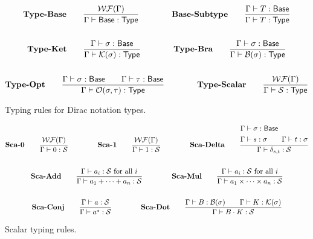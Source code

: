\documentclass{article}
\begin{document}
\begin{figure}[h]
    \begin{gather*}
        \textbf{Type-Base} \qquad
        \frac{\mathcal{WF}(\Gamma)}{\Gamma \vdash \mathsf{Base} : \mathsf{Type}} 
        \qquad \qquad
        \textbf{Base-Subtype} \qquad
        \frac{\Gamma \vdash T : \mathsf{Base}}{\Gamma \vdash T : \mathsf{Type}} \\
        \\
        \textbf{Type-Ket} \qquad
        \frac{\Gamma \vdash \sigma : \mathsf{Base}}{\Gamma \vdash \mathcal{K}(\sigma) : \mathsf{Type}}
        \qquad \qquad
        \textbf{Type-Bra} \qquad
        \frac{\Gamma \vdash \sigma : \mathsf{Base}}{\Gamma \vdash \mathcal{B}(\sigma) : \mathsf{Type}} \\
        \\
        \textbf{Type-Opt} \qquad
        \frac{\Gamma \vdash \sigma : \mathsf{Base} \qquad \Gamma \vdash \tau : \mathsf{Base}}{\Gamma \vdash \mathcal{O}(\sigma, \tau) : \mathsf{Type}}
        \qquad \qquad
        \textbf{Type-Scalar} \qquad
        \frac{\mathcal{WF}(\Gamma)}{\Gamma \vdash \mathcal{S} : \mathsf{Type}}
    \end{gather*}
    \caption{Typing rules for Dirac notation types.}
\end{figure}

\begin{figure}[h]
    \begin{gather*}
        \textbf{Sca-0} \qquad
        \frac{\mathcal{WF}(\Gamma)}{\Gamma \vdash 0 : \mathcal{S}}
        \qquad \qquad
        \textbf{Sca-1} \qquad
        \frac{\mathcal{WF}(\Gamma)}{\Gamma \vdash 1 : \mathcal{S}}
        \qquad \qquad
        \textbf{Sca-Delta} \qquad
        \frac{            
            \begin{aligned}
                & \Gamma\vdash \sigma : \mathsf{Base} \\
                & \Gamma\vdash s : \sigma \qquad \Gamma\vdash t : \sigma
            \end{aligned}} {\Gamma \vdash \delta_{s, t} : \mathcal{S}} \\
        \\
        \textbf{Sca-Add} \qquad
        \frac{\Gamma\vdash a_i : \mathcal{S} \text{ for all $i$}}{\Gamma\vdash a_1 + \cdots + a_n : \mathcal{S}}
        \qquad \qquad
        \textbf{Sca-Mul} \qquad
        \frac{\Gamma\vdash a_i : \mathcal{S} \text{ for all $i$}}{\Gamma\vdash a_1 \times \cdots \times a_n : \mathcal{S}} \\
        \\
        \textbf{Sca-Conj} \qquad
        \frac{\Gamma \vdash a : \mathcal{S}}{\Gamma \vdash a^*:\mathcal{S}}
        \qquad \qquad
        \textbf{Sca-Dot} \qquad
        \frac{\Gamma\vdash B : \mathcal{B}(\sigma) \qquad \Gamma\vdash K : \mathcal{K}(\sigma)}{\Gamma \vdash B \cdot K : \mathcal{S}}
    \end{gather*}
    \caption{Scalar typing rules.}
\end{figure}
\end{document}
